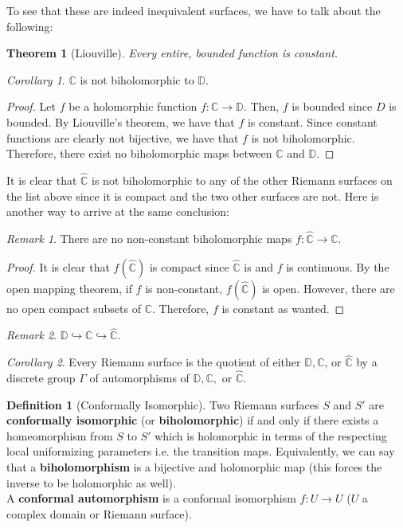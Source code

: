 \documentclass[a4paper, 11pt]{book}
\newtheorem{theorem}{Theorem}
\theoremstyle{definition}
\newtheorem{definition}{Definition}[section]
\theoremstyle{remark}
\newtheorem*{remark}{Remark}
\newtheorem{corollary}{Corollary}[theorem]
\begin{document}
    To see that these are indeed inequivalent surfaces, we have to talk about the following:

    \begin{theorem}[Liouville]
        Every entire, bounded function is constant.
    \end{theorem}

    \begin{corollary}
        $\mathbb{C}$ is not biholomorphic to $\mathbb{D}$.
    \end{corollary}
    \begin{proof}
        Let $f$ be a holomorphic function $f:\mathbb{C}\to\mathbb{D}$. Then, $f$ is bounded since $D$ is bounded. By Liouville's
        theorem, we have that $f$ is constant. Since constant functions are clearly not bijective, we have that $f$ is not
        biholomorphic. Therefore, there exist no biholomorphic maps between $\mathbb{C}$ and $\mathbb{D}$. 
    \end{proof}

    It is clear that $\hat{\mathbb{C}}$ is not biholomorphic to any of the other Riemann surfaces on the list above since it is
    compact and the two other surfaces are not. Here is another way to arrive at the same conclusion:

    \begin{remark}
        There are no non-constant biholomorphic maps $f:\hat{\mathbb{C}}\to\mathbb{C}$.
    \end{remark}
    \begin{proof}
        It is clear that $f(\hat{\mathbb{C}})$ is compact since $\hat{\mathbb{C}}$ is and $f$ is continuous. By the open mapping
        theorem, if $f$ is non-constant, $f(\hat{\mathbb{C}})$ is open. However, there are no open compact subsets of $\mathbb{C}$.
        Therefore, $f$ is constant as wanted.
    \end{proof}

    \begin{remark}
        $\mathbb{D}\hookrightarrow \mathbb{C} \hookrightarrow \hat{\mathbb{C}}$.
    \end{remark}

    \begin{corollary}
        Every Riemann surface is the quotient of either $\mathbb{D},\mathbb{C}$, or $\hat{\mathbb{C}}$ by a discrete group $\Gamma$
        of automorphisms of $\mathbb{D},\mathbb{C},$ or $\hat{\mathbb{C}}$.
    \end{corollary}

    \begin{definition}[Conformally Isomorphic]
        Two Riemann surfaces $S$ and $S'$ are \textbf{conformally isomorphic} (or \textbf{biholomorphic}) if and only if there
        exists a homeomorphism from $S$ to $S'$ which is holomorphic in terms of the respecting local uniformizing parameters i.e.
        the transition maps. Equivalently, we can say that a \textbf{biholomorphism} is a bijective and holomorphic map (this forces
        the inverse to be holomorphic as well).\\
        A \textbf{conformal automorphism} is a conformal isomorphism $f:U\to U$ ($U$ a complex domain or Riemann surface). 
    \end{definition}
\end{document}
